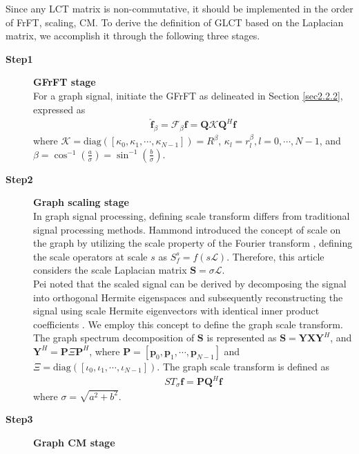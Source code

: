 \documentclass[lettersize,journal]{IEEEtran}
\begin{document}
Since any LCT matrix is non-commutative, it should be implemented in the order of FrFT, scaling, CM. To derive the definition of GLCT based on the Laplacian matrix, we accomplish it through the following three stages.
\begin{description}
	\item[\textbf{Step1}] \textbf{GFrFT stage} \\
	For a graph signal, initiate the GFrFT as delineated in Section \ref{sec2.2.2}, expressed as 
	\begin{align} \label{eq13}
		\hat{\mathbf{f}}_{\beta} = \mathcal{F}_{\beta}\mathbf{f} = \mathbf{Q} \mathcal{K} \mathbf{Q}^H \mathbf{f}
	\end{align}
	where $\mathcal{K}=\mathrm{diag}\left( \left[\kappa_0, \kappa_1, \cdots, \kappa_{N-1}\right] \right)=R^{\beta}$, $\kappa_l=r_l^{\beta}, l=0,\cdots,N-1$, and $\beta=\cos ^{-1}\left(\frac{a}{\sigma}\right)=\sin ^{-1}\left(\frac{b}{\sigma}\right)$.
	\item[\textbf{Step2}] \textbf{Graph scaling stage} \\
	In graph signal processing, defining scale transform differs from traditional signal processing methods. Hammond introduced the concept of scale on the graph by utilizing the scale property of the Fourier transform \cite{hammond2011wavelets}, defining the scale operators at scale $s$ as $S_f^s=f(s\mathcal{L})$.
	Therefore, this article considers the scale Laplacian matrix $\mathbf{S}={\sigma} \mathcal{L}$. \\
	Pei noted that the scaled signal can be derived by decomposing the signal into orthogonal Hermite eigenspaces and subsequently reconstructing the signal using scale Hermite eigenvectors with identical inner product coefficients \cite{pei2011discrete}. We employ this concept to define the graph scale transform. \\
	The graph spectrum decomposition of $\mathbf{S}$ is represented as 
	$\mathbf{S}=\mathbf{Y} \mathbf{X} \mathbf{Y}^H$, and
	$\mathbf{Y}^H=\mathbf{P} {\Xi} \mathbf{P}^H$, where $\mathbf{P}=\left[\mathbf{p}_0, \mathbf{p}_1, \cdots, \mathbf{p}_{N-1}\right]$ and $ {\Xi}=\mathrm{diag}\left( \left[\iota_0, \iota_1, \cdots, \iota_{N-1}\right] \right)$. 
	The graph scale transform is defined as 
	\begin{align}\label{eq14}
		{ST}_{\sigma}\mathbf{f}=\mathbf{P}\mathbf{Q}^H\mathbf{f}
	\end{align} 
	where $\sigma=\sqrt{a^2+b^2}$.
	\item[\textbf{Step3}] \textbf{Graph CM stage} \\

\end{description}
\end{document}
